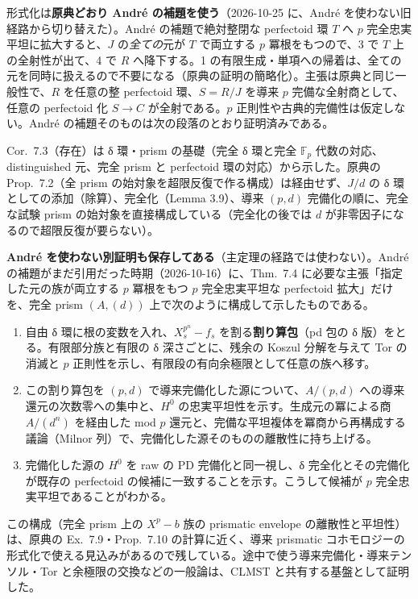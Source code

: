 \documentclass[11pt,a4paper]{ltjsarticle}
\numberwithin{equation}{section}
\theoremstyle{plain}
\theoremstyle{definition}
\theoremstyle{definition}
\begin{document}
形式化は\textbf{原典どおり André の補題を使う}（2026-10-25 に、André を使わない旧経路から切り替えた）。André の補題で絶対整閉な perfectoid 環 $T$ へ $p$ 完全忠実平坦に拡大すると、$J$ の\emph{全ての}元が $T$ で両立する $p$ 冪根をもつので、3 で $T$ 上の全射性が出て、4 で $R$ へ降下する。1 の有限生成・単項への帰着は、全ての元を同時に扱えるので不要になる（原典の証明の簡略化）。主張は原典と同じ一般性で、$R$ を任意の整 perfectoid 環、$S=R/J$ を導来 $p$ 完備な全射商として、任意の perfectoid 化 $S\to C$ が全射である。$p$ 正則性や古典的完備性は仮定しない。André の補題そのものは次の段落のとおり証明済みである。

Cor.~7.3（存在）は δ 環・prism の基礎（完全 δ 環と完全 $\mathbb{F}_p$ 代数の対応、distinguished 元、完全 prism と perfectoid 環の対応）から示した。原典の Prop.~7.2（全 prism の始対象を超限反復で作る構成）は経由せず、$J/d$ の δ 環としての添加（除算）、完全化（Lemma 3.9）、導来 $(p,d)$ 完備化の順に、完全な試験 prism の始対象を直接構成している（完全化の後では $d$ が非零因子になるので超限反復が要らない）。

\textbf{André を使わない別証明も保存してある}（主定理の経路では使わない）。André の補題がまだ引用だった時期（2026-10-16）に、Thm.~7.4 に必要な主張「指定した元の族が両立する $p$ 冪根をもつ $p$ 完全忠実平坦な perfectoid 拡大」だけを、完全 prism $(A,(d))$ 上で次のように構成して示したものである。
\begin{enumerate}
  \item 自由 δ 環に根の変数を入れ、$X_s^{p^n}-f_s$ を割る\textbf{割り算包}（pd 包の δ 版）をとる。有限部分族と有限の δ 深さごとに、残余の Koszul 分解を与えて Tor の消滅と $p$ 正則性を示し、有限段の有向余極限として任意の族へ移す。
  \item この割り算包を $(p,d)$ で導来完備化した源について、$A/(p,d)$ への導来還元の次数零への集中と、$H^0$ の忠実平坦性を示す。生成元の冪による商 $A/(d^n)$ を経由した mod $p$ 還元と、完備な平坦複体を冪商から再構成する議論（Milnor 列）で、完備化した源そのものの離散性に持ち上げる。
  \item 完備化した源の $H^0$ を raw の PD 完備化と同一視し、δ 完全化とその完備化が既存の perfectoid の候補に一致することを示す。こうして候補が $p$ 完全忠実平坦であることがわかる。
\end{enumerate}
この構成（完全 prism 上の $X^p-b$ 族の prismatic envelope の離散性と平坦性）は、原典の Ex.~7.9・Prop.~7.10 の計算に近く、導来 prismatic コホモロジーの形式化で使える見込みがあるので残している。途中で使う導来完備化・導来テンソル・Tor と余極限の交換などの一般論は、CLMST と共有する基盤として証明した。
\end{document}

